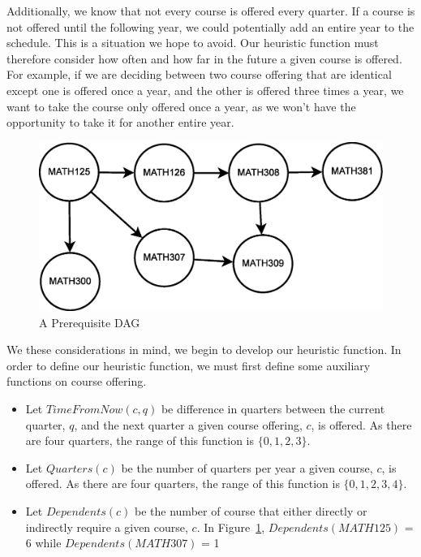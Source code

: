 \documentclass[11pt]{article} %
\begin{document}
Additionally, we know that not every course is offered every quarter.  If
a course is not offered until the following year, we could potentially add an
entire year to the schedule.  This is a situation we hope to avoid.  Our heuristic
function must therefore consider how often and how far in the future a given
course is offered.  For example, if we are deciding between two course offering
that are identical except one is offered once a year, and the other is offered
three times a year, we want to take the course only offered once a year, as we
won't have the opportunity to take it for another entire year.
\begin{figure} [ht]
    \begin{center}
        \includegraphics[scale=0.35]{more_prereq_tree}
    \end{center}
    \caption{A Prerequisite DAG}
    \label{prereq}
\end{figure}

We these considerations in mind, we begin to develop our heuristic function.  In
order to define our heuristic function, we must first define some auxiliary
functions on course offering.  \begin{itemize} \item Let $TimeFromNow(c, q)$ be
difference in quarters between the current quarter, $q$, and the next quarter
a given course offering, $c$, is offered.  As there are four quarters, the range
of this function is $\{0, 1, 2, 3\}$.  \item Let $Quarters(c)$ be the number of
quarters per year a given course, $c$, is offered.  As there are four quarters,
the range of this function is $\{0, 1, 2, 3, 4\}$.  \item Let $Dependents(c)$ be
the number of course that either directly or indirectly require a given course,
$c$.  In Figure~\ref{prereq}, $Dependents(MATH125)$ = 6 while
$Dependents(MATH307)$ = 1 \end{itemize}
\end{document}
